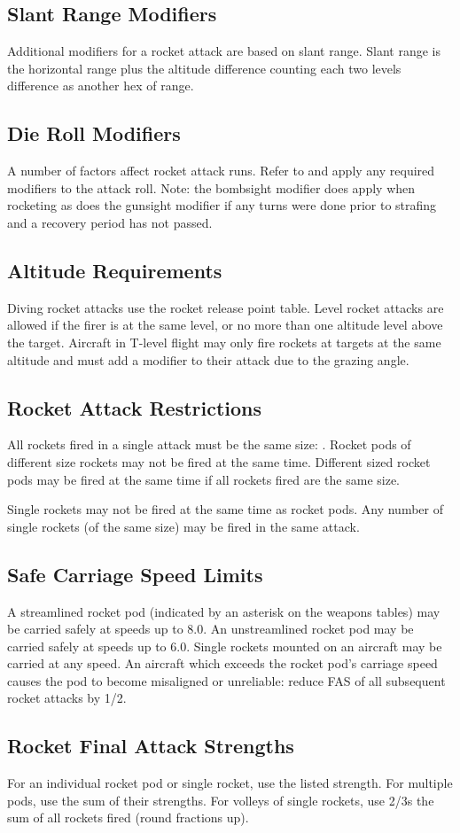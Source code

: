 \subsection{Slant Range Modifiers} Additional modifiers for a rocket attack are based on slant range. Slant range is the horizontal range plus the altitude difference counting each two levels difference as another hex of range.

\subsection{Die Roll Modifiers} A number of factors affect rocket attack runs. Refer to  and apply any required modifiers to the attack roll. Note: the bombsight modifier does apply when rocketing as does the gunsight modifier if any turns were done prior to strafing and a recovery period has not passed.

\subsection{Altitude Requirements} Diving rocket attacks use the rocket release point table. Level rocket attacks are allowed if the firer is at the same level, or no more than one altitude level above the target. Aircraft in T-level flight may only fire rockets at targets at the same altitude and must add a  modifier to their attack due to the grazing angle.

\subsection{Rocket Attack Restrictions} All rockets fired in a single attack must be the same size: . Rocket pods of different size rockets may not be fired at the same time. Different sized rocket pods may be fired at the same time if all rockets fired are the same size.

Single rockets may not be fired at the same time as rocket pods. Any number of single rockets (of the same size) may be fired in the same attack.

\subsection{Safe Carriage Speed Limits} A streamlined rocket pod (indicated by an asterisk on the weapons tables) may be carried safely at speeds up to 8.0. An unstreamlined rocket pod may be carried safely at speeds up to 6.0. Single rockets mounted on an aircraft may be carried at any speed. An aircraft which exceeds the rocket pod's carriage speed causes the pod to become misaligned or unreliable: reduce FAS of all subsequent rocket attacks by 1/2.

\subsection{Rocket Final Attack Strengths} For an individual rocket pod or single rocket, use the listed strength. For multiple pods, use the sum of their strengths. For volleys of single rockets, use 2/3s the sum of all rockets fired (round fractions up).

